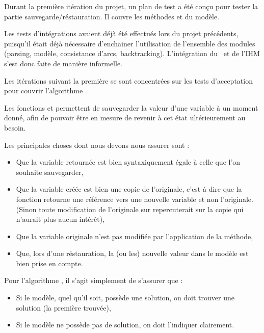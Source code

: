 \label{test:perimetre}

Durant la première itération du projet, un plan de test a été conçu pour tester la partie sauvegarde/réstauration.
Il couvre les méthodes  et  du modèle.

Les tests d'intégrations avaient déjà été effectués lors du projet précédents, puisqu'il était déjà nécessaire d'enchainer l'utilisation de l'ensemble des modules (parsing, modèle, consistance d'arcs, backtracking).
L'intégration du \fla\ et de l'IHM s'est donc faite de manière informelle.

Les itérations suivant la première se sont concentrées sur les tests d'acceptation pour couvrir l'algorithme \fla.




Les fonctions  et  permettent de sauvegarder la valeur d'une variable à un moment donné, afin de pouvoir être en mesure de revenir à cet état ultérieurement au besoin.

Les principales choses dont nous devons nous assurer sont :
\begin{itemize}
	\item Que la variable retournée est bien syntaxiquement égale à celle que l'on souhaite sauvegarder,
	\item Que la variable créée est bien une copie de l'originale, c'est à dire que la fonction retourne une référence vers une nouvelle variable et non l'originale. (Sinon toute modification de l'originale sur repercuterait sur la copie qui n'aurait plus aucun intérêt),
	\item Que la variable originale n'est pas modifiée par l'application de la méthode,
	\item Que, lors d'une réstauration, la (ou les) nouvelle valeur dans le modèle est bien prise en compte.
\end{itemize}

Pour l'algorithme \fla, il s'agit simplement de s'assurer que :
\begin{itemize}
	\item Si le modèle, quel qu'il soit, possède une solution, on doit trouver une solution (la première trouvée),
	\item Si le modèle ne possède pas de solution, on doit l'indiquer clairement.
\end{itemize}



